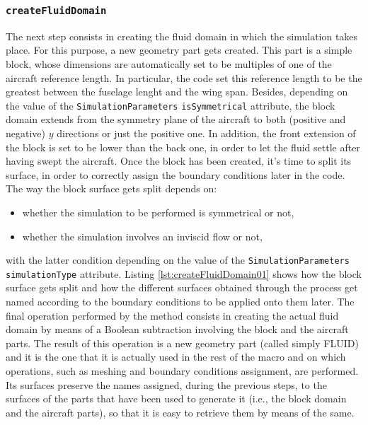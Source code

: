 \subsubsection{\texttt{createFluidDomain}}

The next step consists in creating the fluid domain in which the simulation takes place. For this purpose, a new geometry part gets created. This part is a simple block, whose dimensions are automatically set to be multiples of one of the aircraft reference length. In particular, the code set this reference length to be the greatest between the fuselage lenght and the wing span. Besides, depending on the value of the \lstinline[language=Java]!SimulationParameters! \lstinline[language=Java]!isSymmetrical! attribute, the block domain extends from the symmetry plane of the aircraft to both (positive and negative) $y$ directions or just the positive one. In addition, the front extension of the block is set to be lower than the back one, in order to let the fluid settle after having swept the aircraft. Once the block has been created, it's time to split its surface, in order to correctly assign the boundary conditions later in the code. The way the block surface gets split depends on:
%
\begin{itemize}
\item whether the simulation to be performed is symmetrical or not,
\item whether the simulation involves an inviscid flow or not,
\end{itemize}
%
with the latter condition depending on the value of the \lstinline[language=Java]!SimulationParameters! \lstinline[language=Java]!simulationType! attribute. Listing \ref{lst:createFluidDomain01} shows how the block surface gets split and how the different surfaces obtained through the process get named according to the boundary conditions to be applied onto them later. The final operation performed by the method consists in creating the actual fluid domain by means of a Boolean subtraction involving the block and the aircraft parts. The result of this operation is a new geometry part (called simply FLUID) and it is the one that it is actually used in the rest of the macro and on which operations, such as meshing and boundary conditions assignment, are performed. Its surfaces preserve the names assigned, during the previous steps, to the surfaces of the parts that have been used to generate it (i.e., the block domain and the aircraft parts), so that it is easy to retrieve them by means of the same.
\bigskip
